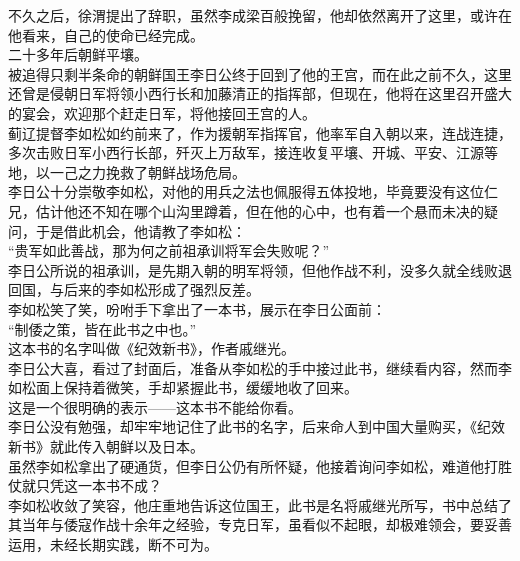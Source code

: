 \begin{multicols}{\theparacolNo}
不久之后，徐渭提出了辞职，虽然李成梁百般挽留，他却依然离开了这里，或许在他看来，自己的使命已经完成。\\

二十多年后朝鲜平壤。\\

被追得只剩半条命的朝鲜国王李日公终于回到了他的王宫，而在此之前不久，这里还曾是侵朝日军将领小西行长和加藤清正的指挥部，但现在，他将在这里召开盛大的宴会，欢迎那个赶走日军，将他接回王宫的人。\\

蓟辽提督李如松如约前来了，作为援朝军指挥官，他率军自入朝以来，连战连捷，多次击败日军小西行长部，歼灭上万敌军，接连收复平壤、开城、平安、江源等地，以一己之力挽救了朝鲜战场危局。\\

李日公十分崇敬李如松，对他的用兵之法也佩服得五体投地，毕竟要没有这位仁兄，估计他还不知在哪个山沟里蹲着，但在他的心中，也有着一个悬而未决的疑问，于是借此机会，他请教了李如松：\\

“贵军如此善战，那为何之前祖承训将军会失败呢？”\\

李日公所说的祖承训，是先期入朝的明军将领，但他作战不利，没多久就全线败退回国，与后来的李如松形成了强烈反差。\\

李如松笑了笑，吩咐手下拿出了一本书，展示在李日公面前：\\

“制倭之策，皆在此书之中也。”\\

这本书的名字叫做《纪效新书》，作者戚继光。\\

李日公大喜，看过了封面后，准备从李如松的手中接过此书，继续看内容，然而李如松面上保持着微笑，手却紧握此书，缓缓地收了回来。\\

这是一个很明确的表示——这本书不能给你看。\\

李日公没有勉强，却牢牢地记住了此书的名字，后来命人到中国大量购买，《纪效新书》就此传入朝鲜以及日本。\\

虽然李如松拿出了硬通货，但李日公仍有所怀疑，他接着询问李如松，难道他打胜仗就只凭这一本书不成？\\

李如松收敛了笑容，他庄重地告诉这位国王，此书是名将戚继光所写，书中总结了其当年与倭寇作战十余年之经验，专克日军，虽看似不起眼，却极难领会，要妥善运用，未经长期实践，断不可为。\\


\end{multicols}

